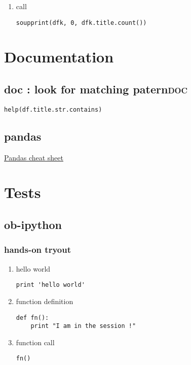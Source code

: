 \documentclass[11pt]{article}
\begin{document}
\begin{enumerate}
\begin{enumerate}
\begin{verbatim}
def souper(html):
    soup = BeautifulSoup(html, 'html.parser')
    print(soup.get_text())

def soupprint(df, begin, end):
    for i in range(begin, end):
	print(i, df.title.iloc[i])
	print("\n")
	print(df.company.iloc[i])
	print("\n")
	souper(df.desc.iloc[i])
	print("\n"*3)
	print("-"*100)
	print("\n"*3)
\end{verbatim}

\item call
\label{sec:org8a57ec2}
\begin{verbatim}
soupprint(dfk, 0, dfk.title.count())
\end{verbatim}
\end{enumerate}
\end{enumerate}
\section{Documentation}
\label{sec:org48ee3c9}
\subsection{doc : look for matching patern\hfill{}\textsc{doc}}
\label{sec:org4628bc7}
\begin{verbatim}
help(df.title.str.contains)
\end{verbatim}

\subsection{pandas}
\label{sec:org20ab6dc}
\href{file:///home/teddd/Cours/Data/cheat-sheets/Pandas\_Cheat\_Sheet.pdf}{Pandas cheat sheet}
\section{Tests}
\label{sec:org8848e0e}
\subsection{ob-ipython}
\label{sec:org4c5a0a0}
\subsubsection{hands-on tryout}
\label{sec:orgf099a8f}
\begin{enumerate}
\item hello world
\label{sec:org2a634eb}
\begin{verbatim}
print 'hello world'
\end{verbatim}
\item function definition
\label{sec:orgbd6308f}
\begin{verbatim}
def fn():
    print "I am in the session !"
\end{verbatim}

\item function call
\label{sec:org8672a1a}
\begin{verbatim}
fn()
\end{verbatim}
\end{enumerate}
\end{document}
